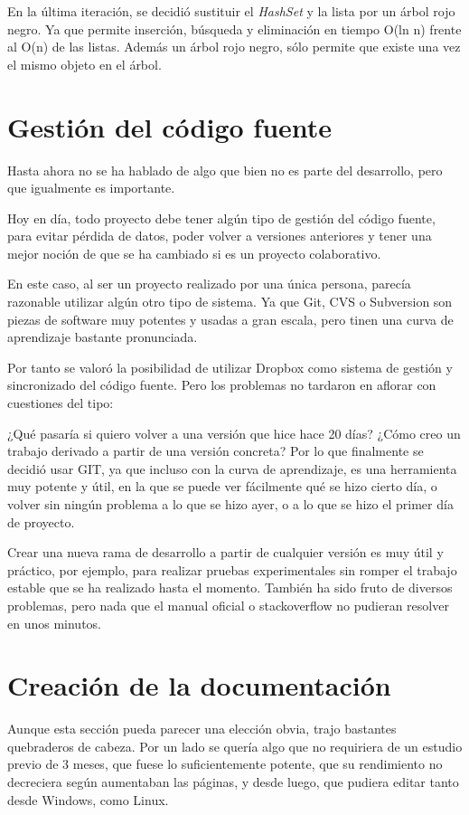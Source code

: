 En la \'ultima iteraci\'on, se decidi\'o sustituir el \emph{HashSet} y la lista por un \'arbol rojo negro. Ya que permite
inserci\'on, b\'usqueda y eliminaci\'on en tiempo O(ln n) frente al O(n) de las listas. 
Adem\'as un \'arbol rojo negro, s\'olo permite que existe una vez el mismo objeto en el \'arbol.

\section{Gesti\'{o}n del c\'{o}digo fuente}
Hasta ahora no se ha hablado de algo que bien no es parte del desarrollo, pero que igualmente es importante.

Hoy en d\'ia, todo proyecto debe tener alg\'un tipo de gesti\'on del c\'odigo fuente, para evitar p\'erdida de datos, 
poder volver a versiones anteriores y tener una mejor noci\'on de que se ha cambiado si es un proyecto colaborativo.

En este caso, al ser un proyecto realizado por una \'unica persona, parec\'ia razonable utilizar alg\'un otro tipo
de sistema. Ya que Git, CVS o Subversion son piezas de software muy potentes y usadas a gran escala, pero tinen
una curva de aprendizaje bastante pronunciada.

Por tanto se valor\'o la posibilidad de utilizar Dropbox como sistema de gesti\'on y sincronizado del c\'odigo fuente.
Pero los problemas no tardaron en aflorar con cuestiones del tipo:

¿Qu\'e pasar\'ia si quiero volver a una versi\'on que hice hace 20 d\'ias? ¿C\'omo creo un trabajo derivado a partir
de una versi\'on concreta? Por lo que finalmente se decidi\'o usar GIT, ya que incluso con la curva de aprendizaje,
es una herramienta muy potente y \'util, en la que se puede ver f\'acilmente qu\'e se hizo cierto d\'ia, o volver sin 
ning\'un problema a lo que se hizo ayer, o a lo que se hizo el primer d\'ia de proyecto.

Crear una nueva rama de desarrollo a partir de cualquier versi\'on es muy \'util y pr\'actico, por ejemplo, para
realizar pruebas experimentales sin romper el trabajo estable que se ha realizado hasta el momento. Tambi\'en
ha sido fruto de diversos problemas, pero nada que el manual oficial o stackoverflow no pudieran
resolver en unos minutos.

\section{Creaci\'{o}n de la documentaci\'{o}n}
Aunque esta secci\'{o}n pueda parecer una elecci\'{o}n obvia, trajo bastantes quebraderos de cabeza. Por un lado
se quer\'{i}a algo que no requiriera
de un estudio previo de 3 meses, que fuese lo suficientemente potente, que su rendimiento no decreciera seg\'{u}n aumentaban las 
p\'{a}ginas, y desde luego,
que pudiera editar tanto desde Windows, como Linux.

